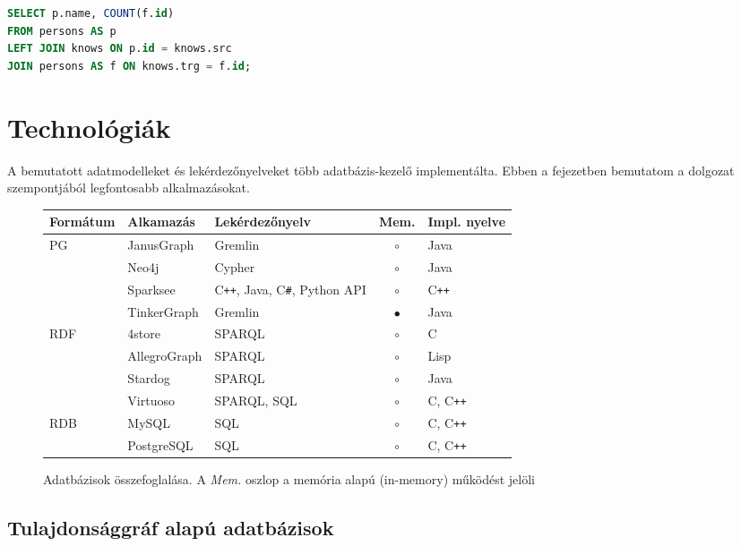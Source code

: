\vspace{1.5ex}

\noindent
\begin{minipage}{\textwidth}
\begin{lstlisting}[frame=single,language=SQL,caption=SQL példakód]
SELECT p.name, COUNT(f.id)
FROM persons AS p
LEFT JOIN knows ON p.id = knows.src
JOIN persons AS f ON knows.trg = f.id;
\end{lstlisting}
\end{minipage}


\section{Technológiák}	

A bemutatott adatmodelleket és lekérdezőnyelveket több adatbázis-kezelő implementálta. Ebben a fejezetben bemutatom a dolgozat szempontjából legfontosabb alkalmazásokat. 

\begin{figure}[h]
	\centering
	\begin{tabular}{lllcl}
		\toprule
		Formátum & Alkamazás & Lekérdezőnyelv & Mem. & Impl. nyelve \\
		\midrule
		PG    & JanusGraph & Gremlin & $\circ$ & Java \\
		      & Neo4j & Cypher & $\circ$ & Java \\
		      & Sparksee & C\texttt{++}, Java, C\texttt{\#}, Python API & $\circ$ & C\texttt{++} \\
		      & TinkerGraph & Gremlin & $\bullet$ & Java \\ \midrule
		RDF   & 4store & SPARQL & $\circ$ & C \\ 
		      & AllegroGraph & SPARQL & $\circ$ & Lisp \\ 
		      & Stardog & SPARQL & $\circ$ & Java \\ 
		      & Virtuoso & SPARQL, SQL & $\circ$ & C, C\texttt{++} \\ \midrule
		RDB   & MySQL & SQL & $\circ$ & C, C\texttt{++} \\
		      & PostgreSQL & SQL & $\circ$ & C, C\texttt{++} \\
		\bottomrule
	\end{tabular}
	\caption{Adatbázisok összefoglalása. A \emph{Mem.} oszlop a memória alapú (in-memory) működést jelöli}
	\label{fig:dbs-table}
\end{figure}

\subsection{Tulajdonsággráf alapú adatbázisok}

